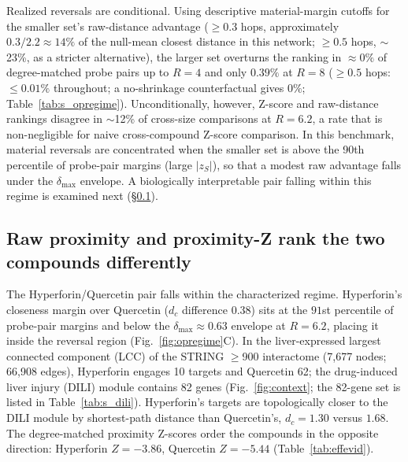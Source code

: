 Realized reversals are conditional. Using descriptive material-margin cutoffs for the smaller set's raw-distance advantage ($\geq 0.3$ hops, approximately $0.3/2.2 \approx 14\%$ of the null-mean closest distance in this network; $\geq 0.5$ hops, $\sim$23\%, as a stricter alternative), the larger set overturns the ranking in $\approx 0\%$ of degree-matched probe pairs up to $R=4$ and only $0.39\%$ at $R=8$ ($\geq 0.5$ hops: $\leq 0.01\%$ throughout; a no-shrinkage counterfactual gives $0\%$; Table~\ref{tab:s_opregime}). Unconditionally, however, Z-score and raw-distance rankings disagree in $\sim$12\% of cross-size comparisons at $R=6.2$, a rate that is non-negligible for naive cross-compound Z-score comparison. In this benchmark, material reversals are concentrated when the smaller set is above the 90th percentile of probe-pair margins (large $|z_S|$), so that a modest raw advantage falls under the $\delta_{\max}$ envelope. A biologically interpretable pair falling within this regime is examined next (\S\ref{subsec:dissociate}).



\subsection{Raw proximity and proximity-Z rank the two compounds differently}
\label{subsec:dissociate}

The Hyperforin/Quercetin pair falls within the characterized regime. Hyperforin's closeness margin over Quercetin ($d_c$ difference $0.38$) sits at the $91$st percentile of probe-pair margins and below the $\delta_{\max}\approx 0.63$ envelope at $R=6.2$, placing it inside the reversal region (Fig.~\ref{fig:opregime}C). In the liver-expressed largest connected component (LCC) of the STRING $\geq$900 interactome (7{,}677 nodes; 66{,}908 edges), Hyperforin engages 10 targets and Quercetin 62; the drug-induced liver injury (DILI) module contains 82 genes (Fig.~\ref{fig:context}; the 82-gene set is listed in Table~\ref{tab:s_dili}). Hyperforin's targets are topologically closer to the DILI module by shortest-path distance than Quercetin's, $d_c = 1.30$ versus $1.68$. The degree-matched proximity Z-scores order the compounds in the opposite direction: Hyperforin $Z = -3.86$, Quercetin $Z = -5.44$ (Table~\ref{tab:effevid}).

